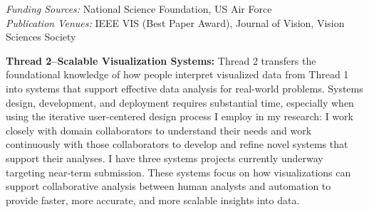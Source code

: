 \documentclass[11pt]{article}
\begin{document}


\emph{Funding Sources:} National Science Foundation, US Air Force\\
\emph{Publication Venues:} IEEE VIS (Best Paper Award), Journal of Vision, Vision Sciences Society

\textbf{Thread 2--Scalable Visualization Systems: }
Thread 2 transfers the foundational knowledge of how people interpret visualized data from Thread 1 into systems that support effective data analysis for real-world problems. 
Systems design, development, and deployment requires substantial time, especially when using the iterative user-centered design process I employ in my research: I work closely with domain collaborators to understand their needs and work continuously with those collaborators to develop and refine novel systems that support their analyses. I have three systems projects currently underway targeting near-term submission. These systems focus on how visualizations can support collaborative analysis between human analysts and automation to provide faster, more accurate, and more scalable insights into data.
\end{document}
